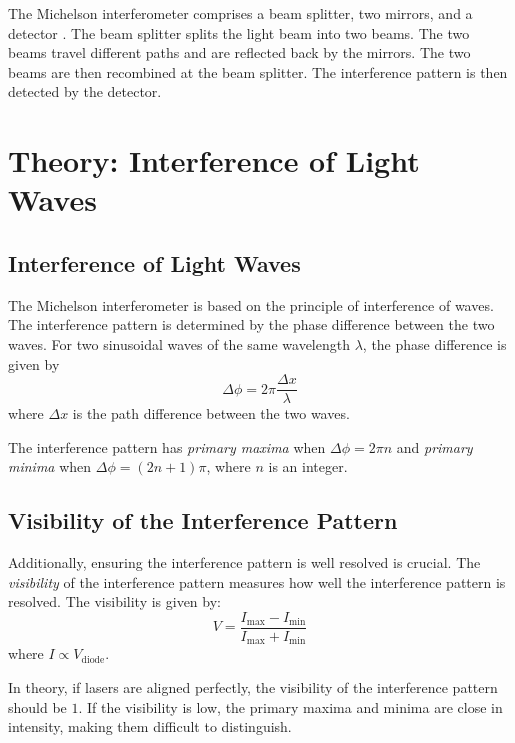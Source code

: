 The Michelson interferometer comprises a beam splitter, two mirrors, and a detector \cite{MichelsonMorley1887,MITOpticalInterferometry2023}. The beam splitter splits the light beam into two beams. The two beams travel different paths and are reflected back by the mirrors. The two beams are then recombined at the beam splitter. The interference pattern is then detected by the detector. 

\section{Theory: Interference of Light Waves}
\subsection{Interference of Light Waves}
The Michelson interferometer is based on the principle of interference of waves. The interference pattern is determined by the phase difference between the two waves. For two sinusoidal waves of the same wavelength $\lambda$, the phase difference is given by
\begin{equation}
\Delta \phi = 2\pi \frac{\Delta x}{\lambda}
\end{equation}
where $\Delta x$ is the path difference between the two waves. 

The interference pattern has \textit{primary maxima} when $\Delta \phi = 2\pi n$ and \textit{primary minima} when $\Delta \phi = (2n+1)\pi$, where $n$ is an integer. 

\subsection{Visibility of the Interference Pattern}

Additionally, ensuring the interference pattern is well resolved is crucial. The \textit{visibility} of the interference pattern measures how well the interference pattern is resolved. The visibility is given by:
\begin{equation}
    V = \frac{I_{\text{max}} - I_{\text{min}}}{I_{\text{max}} + I_{\text{min}}}
\end{equation}
where $I \propto V_{\text{diode}}$. 

In theory, if lasers are aligned perfectly, the visibility of the interference pattern should be $1$. If the visibility is low, the primary maxima and minima are close in intensity, making them difficult to distinguish. 

